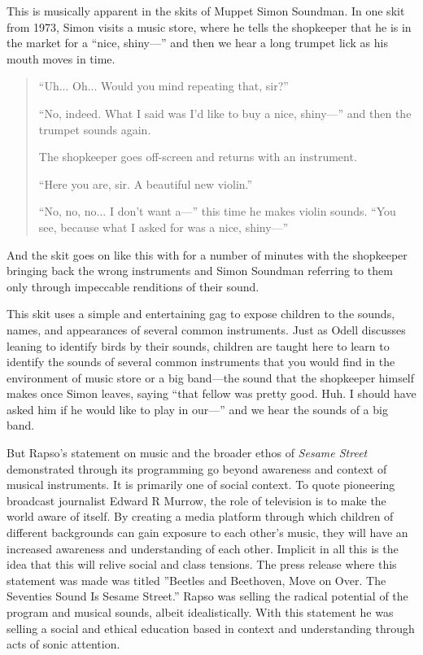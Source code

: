 \documentclass[12pt,letterpaper]{article}
\newcommand{\ses}{\textit{Sesame Street }}
\begin{document}
	This is musically apparent in the skits of Muppet Simon Soundman.
	In one skit from 1973,\autocite{0458} Simon visits a music store, where
	he tells the shopkeeper
	that he is in the market for a ``nice, shiny---'' and then we hear a
	long trumpet lick as his mouth moves in time. 

	\begin{quote}

	``Uh... Oh... Would you mind repeating that, sir?''

	``No, indeed. What I said was I'd like to buy a nice, shiny---'' and
	then the trumpet sounds again. 

	The shopkeeper goes off-screen and returns with an instrument. 
	 
	``Here you are, sir. A beautiful new violin.''

	``No, no, no... I don't want a---'' this time he makes violin
	sounds.  ``You see, because what I asked for was a nice, shiny---''
	
	\end{quote}
	
	And the skit goes on like this with for a number of minutes with the 
	shopkeeper bringing back the wrong instruments and Simon Soundman
	referring to them only through impeccable renditions of their sound. 
	
	This skit uses a simple and entertaining gag to expose children to the
	sounds, names, and appearances of several common instruments. Just as 
	Odell
	discusses leaning to identify birds by their sounds, children are	
	taught here to learn to identify the sounds of several common 
	instruments that you would find in the environment of music store or 
	a big band---the sound that the shopkeeper himself makes once Simon
	leaves, saying ``that fellow was pretty good. Huh. I should have asked
	him if he would like to play in our---'' and we hear the sounds of a
	big band.  

	But Rapso's statement on music and the broader ethos of \ses 
	demonstrated through its programming go beyond awareness and context of 
	musical instruments. It is primarily one of social context. To quote 
	pioneering broadcast journalist Edward R Murrow,
	the role of television is to make the world aware of
	itself.\autocite[49]{Davis} By creating a media platform through which 
	children of different backgrounds can gain exposure to each other's 
	music, they
	will have an increased awareness and understanding of each other.
	Implicit in all this is the idea that this will relive social and class
	tensions. The press release where this statement was made was titled 
	''Beetles and Beethoven, Move on Over. The Seventies Sound Is Sesame 
	Street.'' Rapso was selling the radical potential of the program and
	musical sounds, albeit idealistically. With this statement he was 
	selling a social and ethical education based in context and 
	understanding through acts of sonic attention. 
\end{document}
